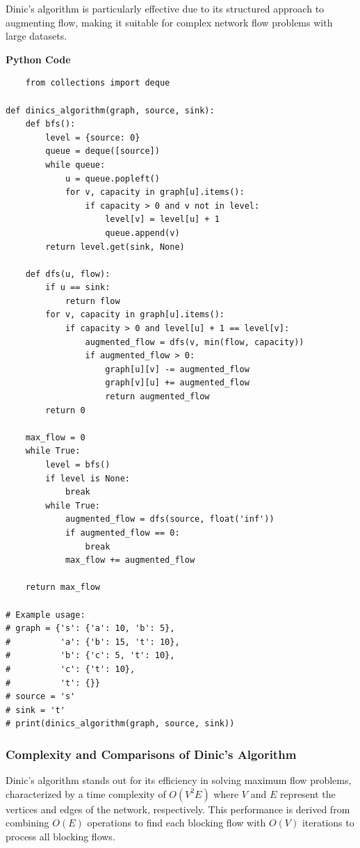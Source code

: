 \documentclass[12pt]{book} %
\begin{document}
Dinic's algorithm is particularly effective due to its structured approach to augmenting flow, making it suitable for complex network flow problems with large datasets.


\textbf{Python Code}
\FloatBarrier
\begin{lstlisting}
    from collections import deque

def dinics_algorithm(graph, source, sink):
    def bfs():
        level = {source: 0}
        queue = deque([source])
        while queue:
            u = queue.popleft()
            for v, capacity in graph[u].items():
                if capacity > 0 and v not in level:
                    level[v] = level[u] + 1
                    queue.append(v)
        return level.get(sink, None)

    def dfs(u, flow):
        if u == sink:
            return flow
        for v, capacity in graph[u].items():
            if capacity > 0 and level[u] + 1 == level[v]:
                augmented_flow = dfs(v, min(flow, capacity))
                if augmented_flow > 0:
                    graph[u][v] -= augmented_flow
                    graph[v][u] += augmented_flow
                    return augmented_flow
        return 0

    max_flow = 0
    while True:
        level = bfs()
        if level is None:
            break
        while True:
            augmented_flow = dfs(source, float('inf'))
            if augmented_flow == 0:
                break
            max_flow += augmented_flow

    return max_flow

# Example usage:
# graph = {'s': {'a': 10, 'b': 5},
#          'a': {'b': 15, 't': 10},
#          'b': {'c': 5, 't': 10},
#          'c': {'t': 10},
#          't': {}}
# source = 's'
# sink = 't'
# print(dinics_algorithm(graph, source, sink))
\end{lstlisting}
\FloatBarrier
\subsubsection{Complexity and Comparisons of Dinic's Algorithm}

Dinic's algorithm stands out for its efficiency in solving maximum flow problems, characterized by a time complexity of \(O(V^2E)\) where \(V\) and \(E\) represent the vertices and edges of the network, respectively. This performance is derived from combining \(O(E)\) operations to find each blocking flow with \(O(V)\) iterations to process all blocking flows.
\end{document}
